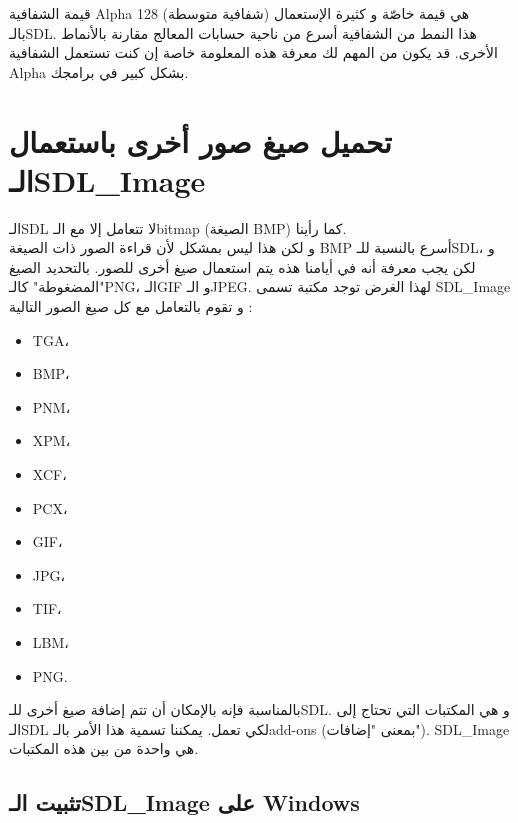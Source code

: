 \begin{information}
قيمة الشفافية
\textenglish{Alpha}
128 (شفافية متوسطة) هي قيمة خاصّة و كثيرة الإستعمال بالـ\textenglish{SDL}.
هذا النمط من الشفافية أسرع من ناحية حسابات المعالج مقارنة بالأنماط الأخرى. قد يكون من المهم لك معرفة هذه المعلومة خاصة إن كنت تستعمل الشفافية
\textenglish{Alpha}
بشكل كبير في برامجك.
\end{information}

\section{تحميل صيغ صور أخرى باستعمال الـ\textenglish{SDL\_Image}}

الـ\textenglish{SDL}
لا تتعامل إلا مع الـ\textenglish{bitmap}
(الصيغة
\textenglish{BMP})
كما رأينا.\\
و لكن هذا ليس بمشكل لأن قراءة الصور ذات الصيغة 
\textenglish{BMP}
أسرع بالنسبة للـ\textenglish{SDL}،
و لكن يجب معرفة أنه في أيامنا هذه يتم استعمال صيغ أخرى للصور. بالتحديد الصيغ "المضغوطة" كالـ\textenglish{PNG}،
الـ\textenglish{GIF}
و الـ\textenglish{JPEG}.
لهذا الغرض توجد مكتبة تسمى
\textenglish{SDL\_Image}
و تقوم بالتعامل مع كل صيغ الصور التالية :

\begin{itemize}
	\item \textenglish{TGA}،
	\item \textenglish{BMP}،
	\item \textenglish{PNM}،
	\item \textenglish{XPM}،
	\item \textenglish{XCF}،
	\item \textenglish{PCX}،
	\item \textenglish{GIF}،
	\item \textenglish{JPG}،
	\item \textenglish{TIF}،
	\item \textenglish{LBM}،
	\item \textenglish{PNG}.
\end{itemize}

بالمناسبة فإنه بالإمكان أن تتم إضافة صيغ أخرى للـ\textenglish{SDL}.
و هي المكتبات التي تحتاج إلى الـ\textenglish{SDL}
لكي تعمل. يمكننا تسمية هذا الأمر بالـ\textenglish{add-ons}
(بمعنى "إضافات").
\textenglish{SDL\_Image}
هي واحدة من بين هذه المكتبات.

\subsection{تثبيت الـ\textenglish{SDL\_Image} على \textenglish{Windows}}

